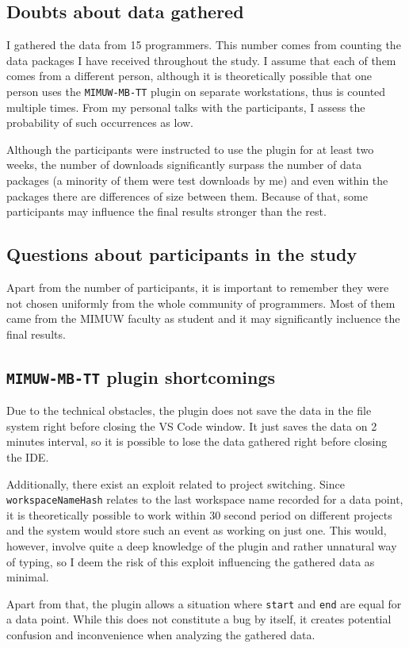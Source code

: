 \subsection{Doubts about data gathered}

I gathered the data from 15 programmers. This number comes from counting the data packages I have received throughout the study. I assume that each of them comes from a different person, although it is theoretically possible that one person uses the \texttt{MIMUW-MB-TT} plugin on separate workstations, thus is counted multiple times. From my personal talks with the participants, I assess the probability of such occurrences as low.

Although the participants were instructed to use the plugin for at least two weeks, the number of downloads significantly surpass the number of data packages (a minority of them were test downloads by me) and even within the packages there are differences of size between them. Because of that, some participants may influence the final results stronger than the rest.

\subsection{Questions about participants in the study}

Apart from the number of participants, it is important to remember they were not chosen uniformly from the whole community of programmers. Most of them came from the MIMUW faculty as student and it may significantly incluence the final results.

\subsection{\texttt{MIMUW-MB-TT} plugin shortcomings}

Due to the technical obstacles, the plugin does not save the data in the file system right before closing the VS Code window. It just saves the data on 2 minutes interval, so it is possible to lose the data gathered right before closing the IDE.

Additionally, there exist an exploit related to project switching. Since \texttt{workspaceNameHash} relates to the last workspace name recorded for a data point, it is theoretically possible to work within 30 second period on different projects and the system would store such an event as working on just one. This would, however, involve quite a deep knowledge of the plugin and rather unnatural way of typing, so I deem the risk of this exploit influencing the gathered data as minimal.

Apart from that, the plugin allows a situation where \texttt{start} and \texttt{end} are equal for a data point. While this does not constitute a bug by itself, it creates potential confusion and inconvenience when analyzing the gathered data.
